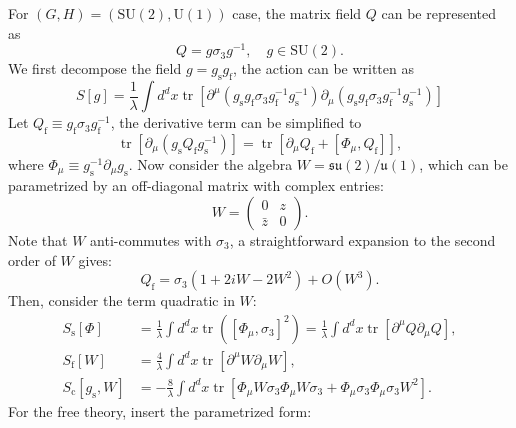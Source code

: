 \documentclass[aps,prb,superscriptaddress,nofootinbib]{revtex4}
\def \tr{\operatorname{tr}}
\begin{document}
For $(G,H)=(\mathrm{SU}(2),\mathrm{U}(1))$ case, the matrix field $Q$ can be represented as
\begin{equation}
	Q = g \sigma_3 g^{-1},\quad g \in \mathrm{SU}(2).
\end{equation}
We first decompose the field $g=g_{\mathrm{s}} g_{\mathrm{f}}$, the action can be written as
\begin{equation}
	S[g] = \frac{1}{\lambda}\int d^d x \tr[\partial^\mu (g_{\mathrm{s}} g_{\mathrm{f}} \sigma_3 g_{\mathrm{f}}^{-1} g_{\mathrm{s}}^{-1})\partial_\mu(g_{\mathrm{s}} g_{\mathrm{f}} \sigma_3 g_{\mathrm{f}}^{-1} g_{\mathrm{s}}^{-1})]
\end{equation}
Let $Q_{\mathrm{f}}\equiv g_{\mathrm{f}} \sigma_3 g_{\mathrm{f}}^{-1}$, the derivative term can be simplified to
\begin{equation}
	\tr[\partial_\mu(g_{\mathrm{s}} Q_{\mathrm{f}} g_{\mathrm{s}}^{-1})] = \tr[\partial_\mu Q_{\mathrm{f}} +[\Phi_\mu,Q_{\mathrm{f}}]],
\end{equation}
where $\Phi_\mu \equiv g_{\mathrm{s}}^{-1}\partial_\mu g_{\mathrm{s}}$.
Now consider the algebra $W=\mathfrak{su}(2)/\mathfrak{u}(1)$, which can be parametrized by an off-diagonal matrix with complex entries:
\begin{equation}
	W = \begin{pmatrix}
		0 & z \\ \bar z & 0
	\end{pmatrix}.
\end{equation}
Note that $W$ anti-commutes with $\sigma_3$, a straightforward expansion to the second order of $W$ gives:
\begin{equation}
	Q_{\mathrm{f}} = \sigma_3(1+2iW-2W^2)+O(W^3).
\end{equation}
Then, consider the term quadratic in $W$:
\begin{equation}\label{eq:AL-Seff}
\begin{aligned}
	S_{\mathrm{s}}[\Phi] &= \frac{1}{\lambda}\int d^d x \tr\left([\Phi_\mu,\sigma_3]^2\right) 
		= \frac{1}{\lambda}\int d^d x \tr[\partial^\mu Q\partial_\mu Q], \\
	S_{\mathrm{f}}[W] &= \frac{4}{\lambda}\int d^d x \tr[\partial^\mu W \partial_\mu W], \\
	S_{\mathrm{c}}[g_{\mathrm{s}},W] &= -\frac{8}{\lambda}\int d^d x \tr[\Phi_\mu W \sigma_3 \Phi_\mu W\sigma_3 + \Phi_\mu \sigma_3 \Phi_\mu \sigma_3 W^2].
\end{aligned}
\end{equation}
For the free theory, insert the parametrized form:
\end{document}

